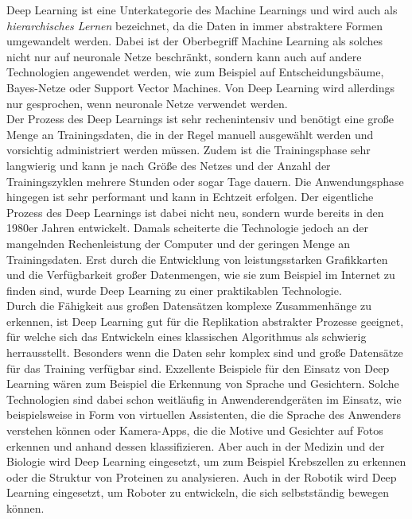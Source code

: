 \newpage

\noindent Deep Learning ist eine Unterkategorie des Machine Learnings und wird auch als \textit{hierarchisches Lernen} bezeichnet, da die Daten in immer abstraktere Formen umgewandelt werden. Dabei ist der Oberbegriff Machine Learning als solches nicht nur auf neuronale Netze beschränkt, sondern kann auch auf andere Technologien angewendet werden, wie zum Beispiel auf Entscheidungsbäume, Bayes-Netze oder Support Vector Machines. Von Deep Learning wird allerdings nur gesprochen, wenn neuronale Netze verwendet werden.\\

\noindent Der Prozess des Deep Learnings ist sehr rechenintensiv und benötigt eine große Menge an Trainingsdaten, die in der Regel manuell ausgewählt werden und vorsichtig administriert werden müssen. Zudem ist die Trainingsphase sehr langwierig und kann je nach Größe des Netzes und der Anzahl der Trainingszyklen mehrere Stunden oder sogar Tage dauern. Die Anwendungsphase hingegen ist sehr performant und kann in Echtzeit erfolgen. Der eigentliche Prozess des Deep Learnings ist dabei nicht neu, sondern wurde bereits in den 1980er Jahren entwickelt. Damals scheiterte die Technologie jedoch an der mangelnden Rechenleistung der Computer und der geringen Menge an Trainingsdaten. Erst durch die Entwicklung von leistungsstarken Grafikkarten und die Verfügbarkeit großer Datenmengen, wie sie zum Beispiel im Internet zu finden sind, wurde Deep Learning zu einer praktikablen Technologie. \\

\noindent Durch die Fähigkeit aus großen Datensätzen komplexe Zusammenhänge zu erkennen, ist Deep Learning gut für die Replikation abstrakter Prozesse geeignet, für welche sich das Entwickeln eines klassischen Algorithmus als schwierig herrausstellt. Besonders wenn die Daten sehr komplex sind und große Datensätze für das Training verfügbar sind. Exzellente Beispiele für den Einsatz von Deep Learning wären zum Beispiel die Erkennung von Sprache und Gesichtern. Solche Technologien sind dabei schon weitläufig in Anwenderendgeräten im Einsatz, wie beispielsweise in Form von virtuellen Assistenten, die die Sprache des Anwenders verstehen können oder Kamera-Apps, die die Motive und Gesichter auf Fotos erkennen und anhand dessen klassifizieren. Aber auch in der Medizin und der Biologie wird Deep Learning eingesetzt, um zum Beispiel Krebszellen zu erkennen oder die Struktur von Proteinen zu analysieren. Auch in der Robotik wird Deep Learning eingesetzt, um Roboter zu entwickeln, die sich selbstständig bewegen können. \\

\newpage